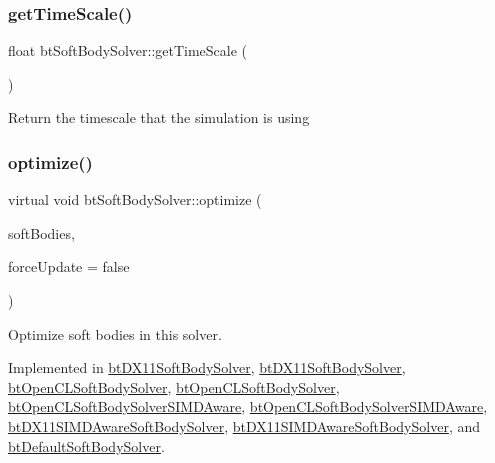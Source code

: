 \mbox{\label{classbtSoftBodySolver_a6abd002edc15d4c80472fd4983679ea2}} 
\subsubsection{\texorpdfstring{get\+Time\+Scale()}{getTimeScale()}}
{\footnotesize\ttfamily float bt\+Soft\+Body\+Solver\+::get\+Time\+Scale (\begin{DoxyParamCaption}{ }\end{DoxyParamCaption})\hspace{0.3cm}{\ttfamily [inline]}}

Return the timescale that the simulation is using \mbox{\label{classbtSoftBodySolver_af07da1ec6f11e7873bc5fafef426fcd3}} 
\subsubsection{\texorpdfstring{optimize()}{optimize()}}
{\footnotesize\ttfamily virtual void bt\+Soft\+Body\+Solver\+::optimize (\begin{DoxyParamCaption}\item[{\hyperlink{classbtAlignedObjectArray}{bt\+Aligned\+Object\+Array}$<$ \hyperlink{classbtSoftBody}{bt\+Soft\+Body} $\ast$ $>$ \&}]{soft\+Bodies,  }\item[{bool}]{force\+Update = {\ttfamily false} }\end{DoxyParamCaption})\hspace{0.3cm}{\ttfamily [pure virtual]}}

Optimize soft bodies in this solver. 

Implemented in \hyperlink{classbtDX11SoftBodySolver_a1d181b7e59619553241ac463db54c490}{bt\+D\+X11\+Soft\+Body\+Solver}, \hyperlink{classbtDX11SoftBodySolver_a59eaf00da6dcf9c6fc25bdb4cff2718a}{bt\+D\+X11\+Soft\+Body\+Solver}, \hyperlink{classbtOpenCLSoftBodySolver_a1340686f32dcdd4e8f36a56788a2e51c}{bt\+Open\+C\+L\+Soft\+Body\+Solver}, \hyperlink{classbtOpenCLSoftBodySolver_abfa7d114dc00cb643d73ecb79682cebe}{bt\+Open\+C\+L\+Soft\+Body\+Solver}, \hyperlink{classbtOpenCLSoftBodySolverSIMDAware_ad1052da1c0e61eac7d9fe1df618c150c}{bt\+Open\+C\+L\+Soft\+Body\+Solver\+S\+I\+M\+D\+Aware}, \hyperlink{classbtOpenCLSoftBodySolverSIMDAware_a5b9fb1bbf50012e83d8e2c38c5fc2afb}{bt\+Open\+C\+L\+Soft\+Body\+Solver\+S\+I\+M\+D\+Aware}, \hyperlink{classbtDX11SIMDAwareSoftBodySolver_a575cf63485ef6a9a55f045e13dcb7717}{bt\+D\+X11\+S\+I\+M\+D\+Aware\+Soft\+Body\+Solver}, \hyperlink{classbtDX11SIMDAwareSoftBodySolver_a438ad9c2749189a20c5c950023893f76}{bt\+D\+X11\+S\+I\+M\+D\+Aware\+Soft\+Body\+Solver}, and \hyperlink{classbtDefaultSoftBodySolver_a6092bc7e7c762770b9202c231025120b}{bt\+Default\+Soft\+Body\+Solver}.

